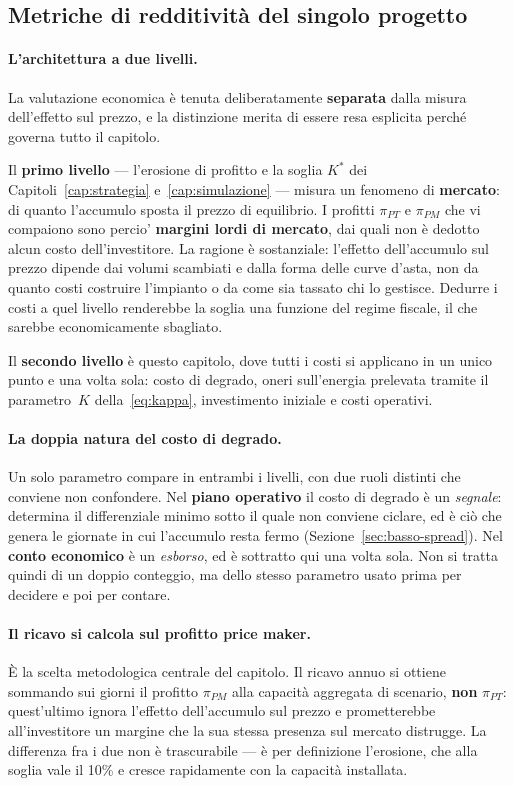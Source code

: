 \subsection{Metriche di redditivit\`a del singolo progetto}

\paragraph{L'architettura a due livelli.} La valutazione economica \`e tenuta
deliberatamente \textbf{separata} dalla misura dell'effetto sul prezzo, e la distinzione
merita di essere resa esplicita perch\'e governa tutto il capitolo.

Il \textbf{primo livello} — l'erosione di profitto e la soglia $K^*$ dei
Capitoli~\ref{cap:strategia} e~\ref{cap:simulazione} — misura un fenomeno di
\textbf{mercato}: di quanto l'accumulo sposta il prezzo di equilibrio. I profitti
$\pi_{PT}$ e $\pi_{PM}$ che vi compaiono sono percio' \textbf{margini lordi di mercato}, dai
quali non \`e dedotto alcun costo dell'investitore. La ragione \`e sostanziale: l'effetto
dell'accumulo sul prezzo dipende dai volumi scambiati e dalla forma delle curve d'asta, non
da quanto costi costruire l'impianto o da come sia tassato chi lo gestisce. Dedurre i costi a
quel livello renderebbe la soglia una funzione del regime fiscale, il che sarebbe
economicamente sbagliato.

Il \textbf{secondo livello} \`e questo capitolo, dove tutti i costi si applicano in un unico
punto e una volta sola: costo di degrado, oneri sull'energia prelevata tramite il
parametro~$K$ della~\eqref{eq:kappa}, investimento iniziale e costi operativi.

\paragraph{La doppia natura del costo di degrado.} Un solo parametro compare in entrambi i
livelli, con due ruoli distinti che conviene non confondere. Nel \textbf{piano operativo} il
costo di degrado \`e un \emph{segnale}: determina il differenziale minimo sotto il quale non
conviene ciclare, ed \`e ci\`o che genera le giornate in cui l'accumulo resta fermo
(Sezione~\ref{sec:basso-spread}). Nel \textbf{conto economico} \`e un \emph{esborso}, ed \`e
sottratto qui una volta sola. Non si tratta quindi di un doppio conteggio, ma dello stesso
parametro usato prima per decidere e poi per contare.

\paragraph{Il ricavo si calcola sul profitto price maker.} \`E la scelta metodologica
centrale del capitolo. Il ricavo annuo si ottiene sommando sui giorni il profitto
$\pi_{PM}$ alla capacit\`a aggregata di scenario, \textbf{non} $\pi_{PT}$: quest'ultimo
ignora l'effetto dell'accumulo sul prezzo e prometterebbe all'investitore un margine che la
sua stessa presenza sul mercato distrugge. La differenza fra i due non \`e trascurabile —
\`e per definizione l'erosione, che alla soglia vale il 10\% e cresce rapidamente con la
capacit\`a installata.

